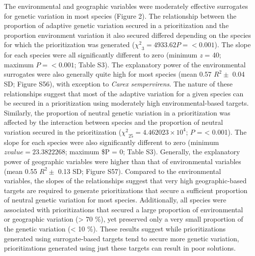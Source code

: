 \documentclass[11pt,]{article}
\begin{document}
The environmental and geographic variables were moderately effective
surrogates for genetic variation in most species (Figure 2). The
relationship between the proportion of adaptive genetic variation
secured in a prioritization and the proportion environment variation it
also secured differed depending on the species for which the
prioritization was generated (\({\chi^2}_{3} = {4933.62} P = < 0.001\)).
The slope for each species were all significantly different to zero
(minimum \textit{z} = 40; maximum \(P = < 0.001\); Table S3). The
explanatory power of the environmental surrogates were also generally
quite high for most species (mean 0.57 \(R^2 \pm\) 0.04 SD; Figure S56),
with exception to \emph{Carex sempervirens}. The nature of these
relationships suggest that most of the adaptive variation for a given
species can be secured in a prioritization using moderately high
environmental-based targets. Similarly, the proportion of neutral
genetic variation in a prioritization was affected by the interaction
between species and the proportion of neutral variation secured in the
prioritization (\({\chi^2}_{25} = 4.462023\times 10^{4}\); \(P\) =
\textless{} 0.001). The slope for each species were also significantly
different to zero (minimum \(z value = 23.3822268\); maximum \$P = 0;
Table S3). Generally, the explanatory power of geographic variables were
higher than that of environmental variables (mean 0.55 \(R^2 \pm\) 0.13
SD; Figure S57). Compared to the environmental variables, the slopes of
the relationships suggest that very high geographic-based targets are
required to generate prioritizations that secure a sufficient proportion
of neutral genetic variation for most species. Additionally, all species
were associated with prioritizations that secured a large proportion of
environmental or geographic variation (\textgreater{} 70 \%), yet
preserved only a very small proportion of the genetic variation
(\textless{} 10 \%). These results suggest while prioritizations
generated using surrogate-based targets tend to secure more genetic
variation, prioritizations generated using just these targets can result
in poor solutions.
\end{document}
